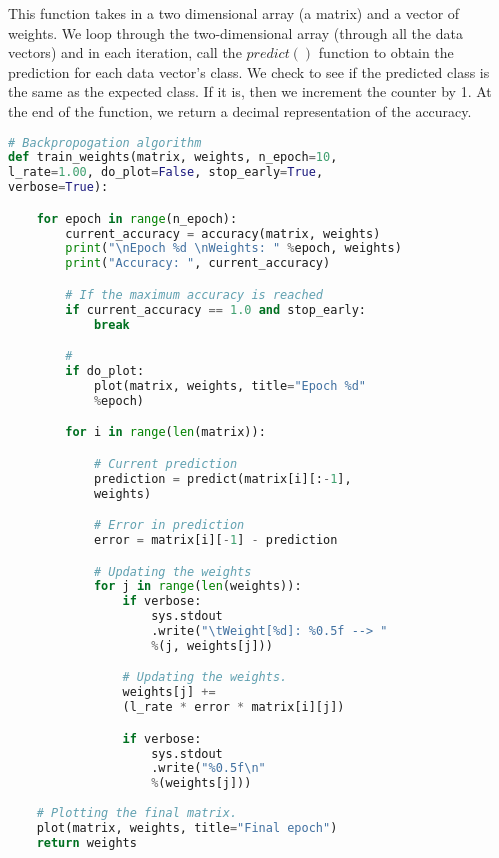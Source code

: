 This function takes in a two dimensional array (a matrix) and a vector of weights. We loop through the two-dimensional array (through all the data vectors) and in each iteration, call the $predict()$ function to obtain the prediction for each data vector's class. We check to see if the predicted class is the same as the expected class. If it is, then we increment the counter by 1. At the end of the function, we return a decimal representation of the accuracy. \\

	\begin{lstlisting}[language=Python, frame=single]
# Backpropogation algorithm
def train_weights(matrix, weights, n_epoch=10, 
l_rate=1.00, do_plot=False, stop_early=True, 
verbose=True):

    for epoch in range(n_epoch):
        current_accuracy = accuracy(matrix, weights)
        print("\nEpoch %d \nWeights: " %epoch, weights)
        print("Accuracy: ", current_accuracy)

        # If the maximum accuracy is reached
        if current_accuracy == 1.0 and stop_early:
            break

		# 
        if do_plot:
            plot(matrix, weights, title="Epoch %d" 
            %epoch)

        for i in range(len(matrix)):

            # Current prediction
            prediction = predict(matrix[i][:-1], 
            weights)

            # Error in prediction
            error = matrix[i][-1] - prediction

            # Updating the weights
            for j in range(len(weights)):
                if verbose:
                    sys.stdout
                    .write("\tWeight[%d]: %0.5f --> "
                    %(j, weights[j]))

                # Updating the weights.
                weights[j] += 
                (l_rate * error * matrix[i][j])

                if verbose:
                    sys.stdout
                    .write("%0.5f\n"
                    %(weights[j]))
    
    # Plotting the final matrix.
    plot(matrix, weights, title="Final epoch")
    return weights
	\end{lstlisting}